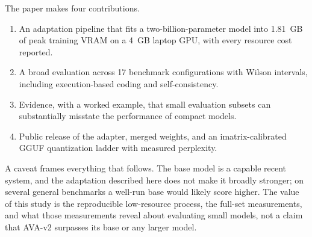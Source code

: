 The paper makes four contributions.
\begin{enumerate}
  \item An adaptation pipeline that fits a two-billion-parameter model into 1.81~GB of peak training VRAM on a 4~GB laptop GPU, with every resource cost reported.
  \item A broad evaluation across 17 benchmark configurations with Wilson intervals, including execution-based coding and self-consistency.
  \item Evidence, with a worked example, that small evaluation subsets can substantially misstate the performance of compact models.
  \item Public release of the adapter, merged weights, and an imatrix-calibrated GGUF quantization ladder with measured perplexity.
\end{enumerate}

A caveat frames everything that follows. The base model is a capable recent system, and the adaptation described here does not make it broadly stronger; on several general benchmarks a well-run base would likely score higher. The value of this study is the reproducible low-resource process, the full-set measurements, and what those measurements reveal about evaluating small models, not a claim that AVA-v2 surpasses its base or any larger model.
